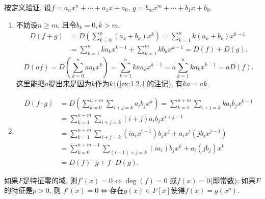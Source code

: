 \begin{solution}
    按定义验证. 设$f = a_nx^n + \cdots + a_1x + a_0$, $g = b_mx^m + \cdots + b_1x + b_0$.
    \begin{enumerate}[(1)]
        \item 不妨设$n \geqslant m$, 且令$b_k = 0, k > m$.
        \[
        \begin{aligned}
            D(f + g) &= D\left(\sum_{k = 0}^{n} (a_k + b_k)x^k\right) = \sum_{k = 1}^{n} k(a_k + b_k)x^{k - 1}\\ 
            &= \sum_{k = 1}^{n} ka_kx^{k - 1} + \sum_{k = 1}^{m} kb_kx^{k - 1} = D(f) + D(g).
        \end{aligned}
        \]
        \[
            D(af) = D\left(\sum_{k = 0}^{n} aa_kx^k\right) = \sum_{k = 1}^{n} kaa_kx^{k - 1} = a\sum_{k = 1}^{n} ka_kx^{k - 1} = aD(f).
        \]
        这里能把$a$提出来是因为$k$作为$k1$(\ref{ex:1.2.1}的注记), 有$ka = ak$.
        \item \[
            \begin{aligned}
                D(f \cdot g) &= D\left(\sum_{k = 0}^{n + m} \sum_{i + j = k} a_ib_jx^k\right) = \sum_{k = 1}^{n + m} \sum_{i + j = k} ka_ib_jx^{k - 1}\\
                &= \sum_{k = 1}^{n + m} \sum_{i + j = k} (i + j)a_ib_jx^{i + j - 1}\\
                &= \sum_{k = 1}^{n + m} \sum_{i + j = k} (ia_ix^{i - 1})b_jx^j + a_ix^i(jb_jx^{j - 1})\\
                &= \sum_{k = 0}^{n + m - 1} \sum_{(i - 1) + j = k} (ia_i)b_jx^{k} + a_i(jb_j)x^k\\
                &= D(f) \cdot g + f \cdot D(g).
            \end{aligned}
        \]
    \end{enumerate}
\end{solution}

\begin{problem}
    如果$F$是特征零的域, 则$f'(x) = 0 \Leftrightarrow \deg(f) = 0$
或$f(x) = 0$(即常数); 如果$F$的特征是$p > 0$, 则
$f'(x) = 0 \Leftrightarrow$存在$g(x) \in F[x]$使得$f(x) = g(x^p)$.
\end{problem}

